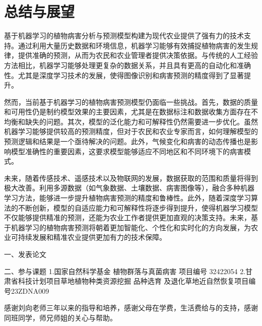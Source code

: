 \documentclass[AutoFakeBold]{LZUThesis-PgD&PhD}
\begin{document}
	\chapter{总结与展望}
	基于机器学习的植物病害分析与预测模型构建为现代农业提供了强有力的技术支持。通过利用大量历史数据和环境信息，机器学习能够有效捕捉植物病害的发生规律，提供准确的预测，从而为农民和农业管理者提供决策依据。与传统的人工经验方法相比，机器学习能够处理更复杂的数据关系，并且具有更高的自动化和准确性。尤其是深度学习技术的发展，使得图像识别和病害预测的精度得到了显著提升。
	
	然而，当前基于机器学习的植物病害预测模型仍面临一些挑战。首先，数据的质量和可用性仍是制约模型效果的主要因素，尤其是在数据标注和数据收集方面存在不均衡和缺失的问题。其次，模型的泛化能力和可解释性仍然需要进一步优化。虽然机器学习能够提供较高的预测精度，但对于农民和农业专家而言，如何理解模型的预测逻辑和结果是一个亟待解决的问题。此外，气候变化和病害的动态传播也是影响模型准确性的重要因素，这要求模型能够适应不同地区和不同环境下的病害模式。
	
	未来，随着传感技术、遥感技术以及物联网的发展，数据获取的范围和质量将得到极大改善。利用多源数据（如气象数据、土壤数据、病害图像等），融合多种机器学习方法，能够进一步提升植物病害预测的精度和鲁棒性。此外，随着深度学习算法的不断创新，模型的自适应能力和可解释性将逐步得到提升，使得机器学习模型不仅能够提供精准的预测，还能为农业工作者提供更加直观的决策支持。未来，基于机器学习的植物病害预测将朝着更加智能化、个性化和实时化的方向发展，为农业可持续发展和精准农业提供更加有力的技术保障。
	
	
	
	\blankpage
	
	
	
	
	\backmatter
	
	
	\printbib
	
	
	
	\Achievements
	一、发表论文
	
	
	\blank
	
	二、参与课题
	1.国家自然科学基金 植物群落与真菌病害 项目编号 32422054
	2.甘肃省科技计划项目草地植物种类资源挖掘 品种选育 及退化草地近自然恢复项目编号23ZDNA009
	
	
	\Thanks
	
	感谢刘向老师三年以来的指导和培养，感谢父母在学费，生活费给与的支持，感谢同班同学，师兄师姐的关心与帮助。
	
	
\end{document}
